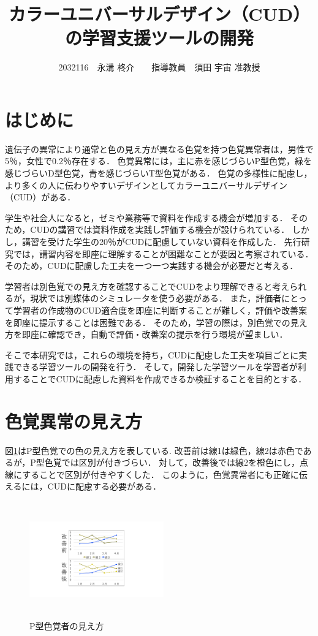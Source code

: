 \documentclass[twocolumn,10pt,a4j]{ltjsarticle}
\title{カラーユニバーサルデザイン（CUD）の学習支援ツールの開発}
\author{2032116　永溝 柊介　　指導教員　須田 宇宙 准教授}
\date{}
\begin{document}
\maketitle

\section{はじめに}

遺伝子の異常により通常と色の見え方が異なる色覚を持つ色覚異常者は，男性で5％，女性で0.2％存在する\cite{okabe2003}．
色覚異常には，主に赤を感じづらいP型色覚，緑を感じづらいD型色覚，青を感じづらいT型色覚がある．
色覚の多様性に配慮し，より多くの人に伝わりやすいデザインとしてカラーユニバーサルデザイン（CUD）がある．

学生や社会人になると，ゼミや業務等で資料を作成する機会が増加する．
そのため，CUDの講習では資料作成を実践し評価する機会が設けられている．
しかし，講習を受けた学生の20％がCUDに配慮していない資料を作成した\cite{sugamiya2020}．
先行研究では，講習内容を即座に理解することが困難なことが要因と考察されている．
そのため，CUDに配慮した工夫を一つ一つ実践する機会が必要だと考える．

学習者は別色覚での見え方を確認することでCUDをより理解できると考えられるが，現状では別媒体のシミュレータを使う必要がある．
また，評価者にとって学習者の作成物のCUD適合度を即座に判断することが難しく，評価や改善案を即座に提示することは困難である．
そのため，学習の際は，別色覚での見え方を即座に確認でき，自動で評価・改善案の提示を行う環境が望ましい．

そこで本研究では，これらの環境を持ち，CUDに配慮した工夫を項目ごとに実践できる学習ツールの開発を行う．
そして，開発した学習ツールを学習者が利用することでCUDに配慮した資料を作成できるか検証することを目的とする．

\section{色覚異常の見え方}
図\ref{fig:pcolor}はP型色覚での色の見え方を表している.
改善前は線1は緑色，線2は赤色であるが，P型色覚では区別が付きづらい．
対して，改善後では線2を橙色にし，点線にすることで区別が付きやすくした．
このように，色覚異常者にも正確に伝えるには，CUDに配慮する必要がある．

\begin{figure}[h]
\begin{center}
 \includegraphics[clip,width=58mm,height=50mm]{images/pcolor.pdf}
\end{center}
 \caption{P型色覚者の見え方}
 \label{fig:pcolor}
\end{figure}
\end{document}
